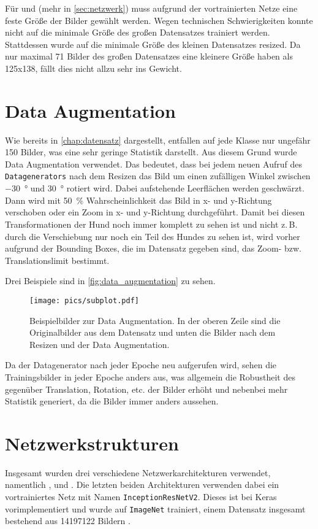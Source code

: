 Für \PreDog und \PreBig (mehr in \autoref{sec:netzwerk}) muss aufgrund der
vortrainierten Netze eine feste Größe der Bilder gewählt werden. Wegen
technischen Schwierigkeiten konnte nicht auf die minimale Größe des großen
Datensatzes trainiert  werden. Stattdessen wurde auf die minimale Größe des
kleinen Datensatzes resized. Da nur maximal 71 Bilder des großen Datensatzes
eine kleinere Größe haben als 125x138, fällt dies nicht allzu sehr ins Gewicht.

\section{Data Augmentation}
Wie bereits in \autoref{chap:datensatz} dargestellt, entfallen auf jede Klasse
nur ungefähr 150 Bilder, was eine sehr geringe Statistik darstellt. Aus diesem
Grund wurde Data Augmentation verwendet. Das bedeutet, dass bei jedem neuen
Aufruf des \texttt{Datagenerators} nach dem Resizen das Bild um einen zufälligen
Winkel zwischen \SI{-30}{\degree} und \SI{30}{\degree} rotiert wird. Dabei
aufstehende Leerflächen werden geschwärzt. Dann wird mit \SI{50}{\percent}
Wahrscheinlichkeit das Bild in x- und y-Richtung verschoben oder ein Zoom in x-
und y-Richtung durchgeführt. Damit bei diesen Transformationen der Hund noch
immer komplett zu sehen ist und nicht z.\,B. durch die Verschiebung nur noch ein
Teil des Hundes zu sehen ist, wird vorher aufgrund der Bounding Boxes, die im
Datensatz gegeben sind, das Zoom- bzw. Translationslimit bestimmt.

Drei Beispiele sind in \autoref{fig:data_augmentation} zu sehen.

\begin{figure}
  \centering
  \texttt{[image: pics/subplot.pdf]}
  \caption{Beispielbilder zur Data Augmentation. In der oberen Zeile sind die
  Originalbilder aus dem Datensatz und unten die Bilder nach dem Resizen und der Data Augmentation.}
  \label{fig:data_augmentation}
\end{figure}

Da der Datagenerator nach jeder Epoche neu aufgerufen wird, sehen die
Trainingsbilder in jeder Epoche anders aus, was allgemein die Robustheit des
\CNN gegenüber Translation, Rotation, etc. der Bilder erhöht und nebenbei mehr
Statistik generiert, da die Bilder immer anders aussehen.

\section{Netzwerkstrukturen}
\label{sec:netzwerk}
Insgesamt wurden drei verschiedene Netzwerkarchitekturen verwendet, namentlich
\MiniDog, \PreDog und \PreBig. Die letzten beiden Architekturen verwenden dabei
ein vortrainiertes Netz mit Namen \texttt{InceptionResNetV2}. Dieses ist bei
Keras vorimplementiert \cite{inception} und wurde auf \texttt{ImageNet}
trainiert, einem Datensatz insgesamt bestehend aus 14197122 Bildern
\cite{imagenet}.

